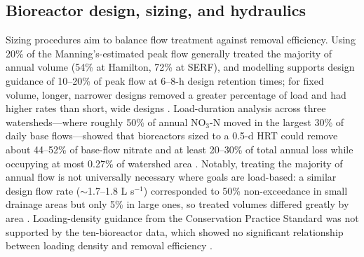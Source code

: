 \subsection{Bioreactor design, sizing, and hydraulics}

Sizing procedures aim to balance flow treatment against removal efficiency. Using 20\% of the Manning's-estimated peak flow generally treated the majority of annual volume (54\% at Hamilton, 72\% at SERF), and modelling supports design guidance of 10--20\% of peak flow at 6--8-h design retention times; for fixed volume, longer, narrower designs removed a greater percentage of load and had higher rates than short, wide designs \parencite{Christianson2013}. Load-duration analysis across three watersheds---where roughly 50\% of annual NO$_3$-N moved in the largest 30\% of daily base flows---showed that bioreactors sized to a 0.5-d HRT could remove about 44--52\% of base-flow nitrate and at least 20--30\% of total annual loss while occupying at most 0.27\% of watershed area \parencite{Moorman2015}. Notably, treating the majority of annual flow is not universally necessary where goals are load-based: a similar design flow rate ($\sim$1.7--1.8 L s$^{-1}$) corresponded to 50\% non-exceedance in small drainage areas but only 5\% in large ones, so treated volumes differed greatly by area \parencite{Christianson2025}. Loading-density guidance from the Conservation Practice Standard was not supported by the ten-bioreactor data, which showed no significant relationship between loading density and removal efficiency \parencite{Christianson2026}.

